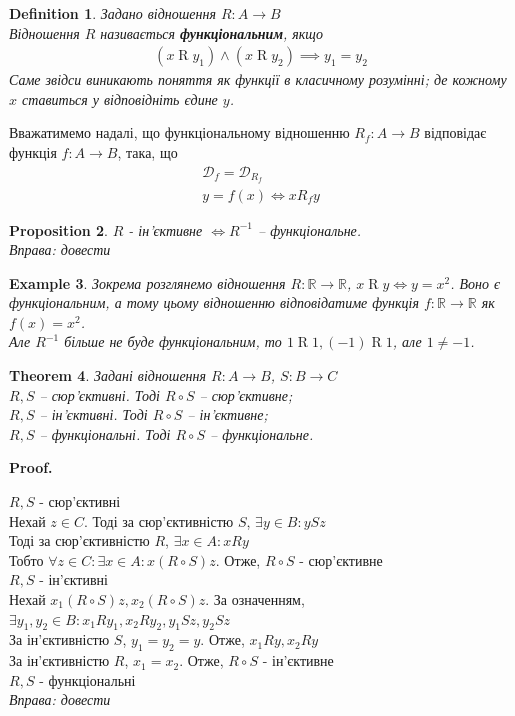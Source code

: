 \documentclass[a4paper, 14pt]{extarticle}
\makeatletter
\theoremstyle{theoremdd}
\newtheorem{theorem}{Theorem}[subsection]
\theoremstyle{theoremdd}
\newtheorem{definition}[theorem]{Definition}
\theoremstyle{theoremdd}
\theoremstyle{theoremdd}
\theoremstyle{theoremdd}
\newtheorem{example}[theorem]{Example}
\theoremstyle{theoremdd}
\theoremstyle{theoremdd}
\theoremstyle{theoremdd}
\theoremstyle{theoremdd}
\newtheorem{proposition}[theorem]{Proposition}
\theoremstyle{theoremdd}
\theoremstyle{theoremdd}
\theoremstyle{theoremdd}
\theoremstyle{theoremdd}
\theoremstyle{theoremdd}
\theoremstyle{theoremdd}
\renewenvironment{proof}[1][Proof.\\]{\par
\pushQED{\hfill \qed}%
\normalfont \topsep6\p@\@plus6\p@\relax
\trivlist
\item\relax
{\bfseries
#1\@addpunct{.}}\hspace\labelsep\ignorespaces
}{%
\popQED\endtrivlist\@endpefalse
}
\makeatother
\begin{document}
\begin{definition}
Задано відношення $R \colon A \to B$\\
Відношення $R$ називається \textbf{функціональним}, якщо
\begin{align*}
(x \mathrel{R} y_1) \wedge (x \mathrel{R} y_2) \implies y_1 = y_2
\end{align*}
Саме звідси виникають поняття як функції в класичному розумінні; де кожному $x$ ставиться у відповідніть єдине $y$.
\end{definition}

Вважатимемо надалі, що функціональному відношенню $R_f \colon A \to B$ відповідає функція $f \colon A \to B$, така, що
\begin{align*}
\mathcal{D}_f = \mathcal{D}_{R_f} \\
y = f(x) \iff x \mathrel{R_f} y
\end{align*}

\begin{proposition}
$R$ - ін'єктивне $\iff R^{-1}$ -- функціональне.\\
\textit{Вправа: довести}
\end{proposition}

\begin{example}
Зокрема розглянемо відношення $R \colon \mathbb{R} \to \mathbb{R}$, $x \mathrel{R} y \iff y = x^2$. Воно є функціональним, а тому цьому відношенню відповідатиме функція $f \colon \mathbb{R} \to \mathbb{R}$ як $f(x) = x^2$.\\
Але $R^{-1}$ більше не буде функціональним, то $1 \mathrel{R} 1, (-1) \mathrel{R} 1$, але $1 \neq -1$.
\end{example}

\begin{theorem}
Задані відношення $R \colon A \to B$, $S \colon B \to C$\\
$R,S$ -- сюр'єктивні. Тоді $R \circ S$ -- сюр'єктивне;\\
$R,S$ -- ін'єктивні. Тоді $R \circ S$ -- ін'єктивне;\\
$R,S$ -- функціональні. Тоді $R \circ S$ -- функціональне.
\end{theorem}

\begin{proof}
$R,S$ - сюр'єктивні\\
Нехай $z \in C$. Тоді за сюр'єктивністю $S$, $\exists y \in B: ySz$\\
Тоді за сюр'єктивністю $R$, $\exists x \in A: xRy$\\
Тобто $\forall z \in C: \exists x \in A: x(R \circ S)z$. Отже, $R \circ S$ - сюр'єктивне
\bigskip \\
$R,S$ - ін'єктивні\\
Нехай $x_1(R \circ S)z, x_2(R \circ S)z$. За означенням,\\
$\exists y_1,y_2 \in B: x_1Ry_1, x_2Ry_2, y_1Sz, y_2Sz$\\
За ін'єктивністю $S$, $y_1 = y_2 = y$. Отже, $x_1Ry,x_2Ry$\\
За ін'єктивністю $R$, $x_1 = x_2$. Отже, $R \circ S$ - ін'єктивне
\bigskip \\
$R,S$ - функціональні\\
\textit{Вправа: довести}
\end{proof}
\end{document}
